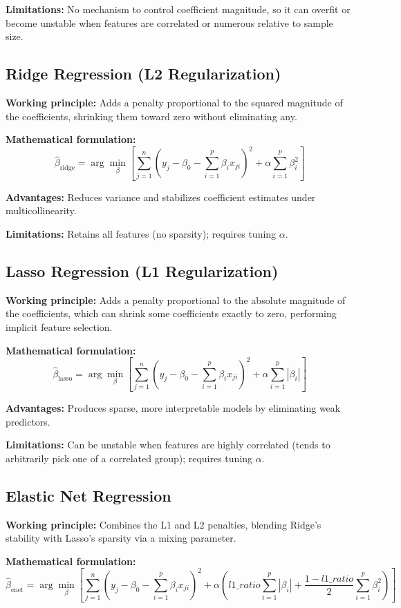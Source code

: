 \documentclass[12pt,a4paper]{article}
\begin{document}
\textbf{Limitations:} No mechanism to control coefficient magnitude, so it can overfit or become
unstable when features are correlated or numerous relative to sample size.

\subsection*{Ridge Regression (L2 Regularization)}
\textbf{Working principle:} Adds a penalty proportional to the squared magnitude of the
coefficients, shrinking them toward zero without eliminating any.

\textbf{Mathematical formulation:}
\[
\hat{\beta}_{\text{ridge}} = \arg\min_{\beta}\left[\sum_{j=1}^{n}\left(y_j - \beta_0 -
\sum_{i=1}^{p}\beta_i x_{ji}\right)^2 + \alpha\sum_{i=1}^{p}\beta_i^2\right]
\]

\textbf{Advantages:} Reduces variance and stabilizes coefficient estimates under multicollinearity.

\textbf{Limitations:} Retains all features (no sparsity); requires tuning $\alpha$.

\subsection*{Lasso Regression (L1 Regularization)}
\textbf{Working principle:} Adds a penalty proportional to the absolute magnitude of the
coefficients, which can shrink some coefficients exactly to zero, performing implicit feature
selection.

\textbf{Mathematical formulation:}
\[
\hat{\beta}_{\text{lasso}} = \arg\min_{\beta}\left[\sum_{j=1}^{n}\left(y_j - \beta_0 -
\sum_{i=1}^{p}\beta_i x_{ji}\right)^2 + \alpha\sum_{i=1}^{p}|\beta_i|\right]
\]

\textbf{Advantages:} Produces sparse, more interpretable models by eliminating weak predictors.

\textbf{Limitations:} Can be unstable when features are highly correlated (tends to arbitrarily
pick one of a correlated group); requires tuning $\alpha$.

\subsection*{Elastic Net Regression}
\textbf{Working principle:} Combines the L1 and L2 penalties, blending Ridge's stability with
Lasso's sparsity via a mixing parameter.

\textbf{Mathematical formulation:}
\[
\hat{\beta}_{\text{enet}} = \arg\min_{\beta}\left[\sum_{j=1}^{n}\left(y_j - \beta_0 -
\sum_{i=1}^{p}\beta_i x_{ji}\right)^2 + \alpha\left(l1\_ratio\sum_{i=1}^{p}|\beta_i| +
\frac{1-l1\_ratio}{2}\sum_{i=1}^{p}\beta_i^2\right)\right]
\]
\end{document}
